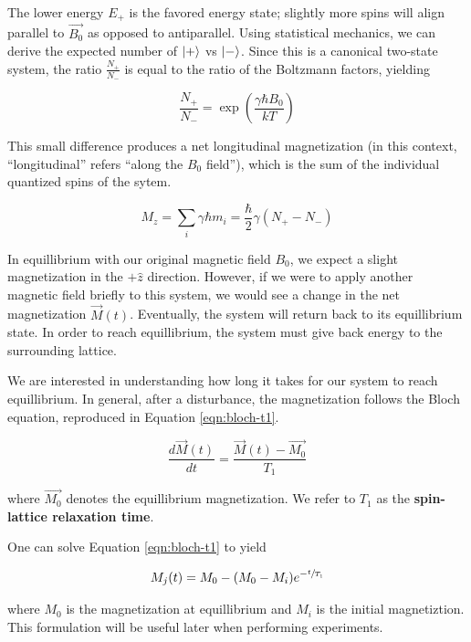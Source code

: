 \documentclass[%
 reprint,
 amsmath,amssymb,
 aps,
]{revtex4-2}
\DeclarePairedDelimiter\ket{\lvert}{\rangle}
\begin{document}
The lower energy $E_+$ is the favored energy state; slightly more spins will align parallel to $\vec{B_0}$ as opposed to antiparallel. Using statistical mechanics, we can derive the expected number of $\ket{+}$ vs $\ket{-}$. Since this is a canonical two-state system, the ratio $\frac{N_+}{N_-}$ is equal to the ratio of the Boltzmann factors, yielding 

\begin{equation}
    \frac{N_+}{N_-} = \exp\left(\frac{\gamma \hbar B_0}{k T}\right)
\end{equation}

This small difference produces a net longitudinal magnetization (in this context, ``longitudinal'' refers ``along the $B_0$ field''), which is the sum of the individual quantized spins of the sytem. \cite{lab-manual}

\begin{equation}
    M_z = \sum_i \gamma \hbar m_i = \frac{\hbar}{2} \gamma (N_+ - N_-)
\end{equation}

In equillibrium with our original magnetic field $B_0$, we expect a slight magnetization in the $+\hat{z}$ direction. However, if we were to apply another magnetic field briefly to this system, we would see a change in the net magnetization $\vec{M}(t)$. Eventually, the system will return back to its equillibrium state. In order to reach equillibrium, the system must give back energy to the surrounding lattice. 

We are interested in understanding how long it takes for our system to reach equillibrium. In general, after a disturbance, the magnetization follows the Bloch equation, reproduced in Equation \ref{eqn:bloch-t1}.

\begin{equation}\label{eqn:bloch-t1}
    \frac{d \vec{M}(t)}{dt} = \frac{\vec{M}(t)-\vec{M_0}}{T_1}
\end{equation}

where $\vec{M_0}$ denotes the equillibrium magnetization. We refer to $T_1$ as the \textbf{spin-lattice relaxation time}. \cite{principles-resonance}

One can solve Equation \ref{eqn:bloch-t1} to yield

\begin{equation}\label{eqn:decay-eqn}
    M_{j}(t) = M_0 - (M_0 - M_i)e^{-\sfrac{t}{T_1}}
\end{equation}

where $M_0$ is the magnetization at equillibrium and $M_i$ is the initial magnetiztion.\cite{principles-resonance} This formulation will be useful later when performing experiments. 
\end{document}
